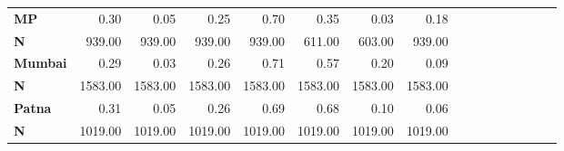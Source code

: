 \begin{tabular}{@{\extracolsep{5pt}}lrrrrrrrrrrrrrrr}
{\bf MP} & 0.30\phantom{***} & 0.05\phantom{***} & 0.25\phantom{***} & 0.70\phantom{***} & 0.35\phantom{***} & 0.03\phantom{***} & 0.18\phantom{***} \\
{\bf N} & 939.00\phantom{***} & 939.00\phantom{***} & 939.00\phantom{***} & 939.00\phantom{***} & 611.00\phantom{***} & 603.00\phantom{***} & 939.00\phantom{***} \\
{\bf Mumbai} & 0.29\phantom{***} & 0.03\phantom{***} & 0.26\phantom{***} & 0.71\phantom{***} & 0.57\phantom{***} & 0.20\phantom{***} & 0.09\phantom{***} \\
{\bf N} & 1583.00\phantom{***} & 1583.00\phantom{***} & 1583.00\phantom{***} & 1583.00\phantom{***} & 1583.00\phantom{***} & 1583.00\phantom{***} & 1583.00\phantom{***} \\
{\bf Patna} & 0.31\phantom{***} & 0.05\phantom{***} & 0.26\phantom{***} & 0.69\phantom{***} & 0.68\phantom{***} & 0.10\phantom{***} & 0.06\phantom{***} \\
{\bf N} & 1019.00\phantom{***} & 1019.00\phantom{***} & 1019.00\phantom{***} & 1019.00\phantom{***} & 1019.00\phantom{***} & 1019.00\phantom{***} & 1019.00\phantom{***} \\
\hline
\end{tabular}
